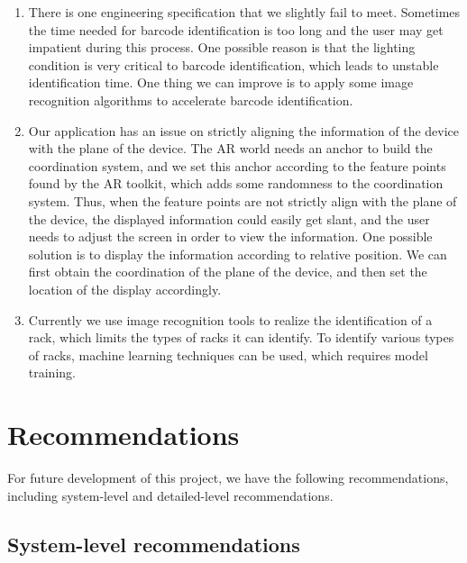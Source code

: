 \documentclass[11pt,a4paper]{article}
\begin{document}
\begin{onehalfspace}
\begin{enumerate}
    \item There is one engineering specification that we slightly fail to meet. Sometimes the time needed for barcode identification is too long and the user may get impatient during this process. One possible reason is that the lighting condition is very critical to barcode identification, which leads to unstable identification time. One thing we can improve is to apply some image recognition algorithms to accelerate barcode identification.
    \item Our application has an issue on strictly aligning the information of the device with the plane of the device. The AR world needs an anchor to build the coordination system, and we set this anchor according to the feature points found by the AR toolkit, which adds some randomness to the coordination system. Thus, when the feature points are not strictly align with the plane of the device, the displayed information could easily get slant, and the user needs to adjust the screen in order to view the information. One possible solution is to display the information according to relative position. We can first obtain the coordination of the plane of the device, and then set the location of the display accordingly.
    \item Currently we use image recognition tools to realize the identification of a rack, which limits the types of racks it can identify. To identify various types of racks, machine learning techniques can be used, which requires model training.
\end{enumerate}



\section{Recommendations}

For future development of this project, we have the following recommendations, including system-level and detailed-level recommendations.

\subsection{System-level recommendations}


\end{onehalfspace}
\end{document}
